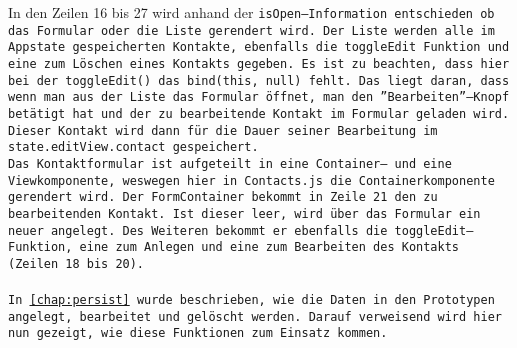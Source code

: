 %
In den Zeilen 16 bis 27 wird anhand der \tt{isOpen}--Information entschieden ob das Formular oder die Liste gerendert wird.
Der Liste werden alle im \gls{App}state gespeicherten Kontakte, ebenfalls die \tt{toggleEdit} Funktion und eine zum Löschen eines Kontakts gegeben.
Es ist zu beachten, dass hier bei der \tt{toggleEdit()} das \tt{bind(this, null)} fehlt. Das liegt daran, dass wenn man aus der Liste das Formular öffnet, man den ''Bearbeiten''--Knopf betätigt hat und der zu bearbeitende Kontakt im Formular geladen wird.
Dieser Kontakt wird dann für die Dauer seiner Bearbeitung im \tt{state.editView.contact} gespeichert.\\
%
Das Kontaktformular ist aufgeteilt in eine Container-- und eine Viewkomponente, weswegen hier in \tt{Contacts.js} die Containerkomponente gerendert wird.
Der \tt{FormContainer} bekommt in Zeile 21 den zu bearbeitenden Kontakt.
Ist dieser leer, wird über das Formular ein neuer angelegt.
Des Weiteren bekommt er ebenfalls die \tt{toggleEdit}--Funktion, eine zum Anlegen und eine zum Bearbeiten des Kontakts (Zeilen 18 bis 20).\\\\
%
%
In \autoref{chap:persist} wurde beschrieben, wie die Daten in den Prototypen angelegt, bearbeitet und gelöscht werden. Darauf verweisend wird hier nun gezeigt, wie diese Funktionen zum Einsatz kommen.